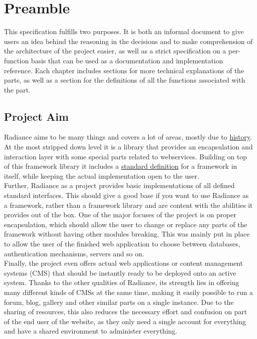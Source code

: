 \chapter{Preamble}\label{sec:preamble}
This specification fulfills two purposes. It is both an informal document to give users an idea behind the reasoning in the decisions and to make comprehension of the architecture of the project easier, as well as a strict specification on a per-function basis that can be used as a documentation and implementation reference. Each chapter includes sections for more technical explanations of the parts, as well as a section for the definitions of all the functions associated with the part.

\section{Project Aim}\label{sec:project aim}
Radiance aims to be many things and covers a lot of areas, mostly due to \hyperref[sec:history]{history}. At the most stripped down level it is a library that provides an encapsulation and interaction layer with some special parts related to webservices. Building on top of this framework library it includes a \hyperref[sec:standard interfaces]{standard definition} for a framework in itself, while keeping the actual implementation open to the user. \\

Further, Radiance as a project provides basic implementations of all defined standard interfaces. This should give a good base if you want to use Radiance as a framework, rather than a framework library and are content with the abilities it provides out of the box. One of the major focuses of the project is on proper encapsulation, which should allow the user to change or replace any parts of the framework without having other modules breaking. This was mainly put in place to allow the user of the finished web application to choose between databases, authentication mechanisms, servers and so on. \\

Finally, the project even offers actual web applications or content management systems (CMS) that should be instantly ready to be deployed onto an active system. Thanks to the other qualities of Radiance, its strength lies in offering many different kinds of CMSs at the same time, making it easily possible to run a forum, blog, gallery and other similar parts on a single instance. Due to the sharing of resources, this also reduces the necessary effort and confusion on part of the end user of the website, as they only need a single account for everything and have a shared environment to administer everything. \\

